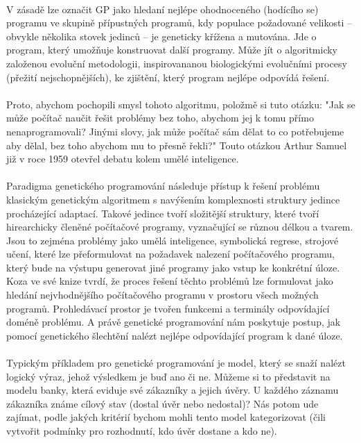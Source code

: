 \documentclass[bc,male,java,dept460]{diploma}		%
\begin{document}
\paragraph*{}
V zásadě lze označit GP jako hledaní nejlépe ohodnoceného (hodícího se) programu ve skupině přípustných programů, kdy populace požadované velikosti – obvykle několika stovek jedinců – je geneticky křížena a mutována.
Jde o program, který umožňuje konstruovat další programy. Může jít o algoritmicky založenou evoluční metodologii, inspirovananou biologickými evolučními procesy (přežití nejschopnějších), ke zjištění, který program nejlépe odpovídá řešení.

\paragraph*{}
Proto, abychom pochopili smysl tohoto algoritmu, položmě si tuto otázku: "Jak se může počítač naučit řešit  problémy bez toho, abychom jej k tomu přímo nenaprogramovali? Jinými slovy, jak může počítač sám dělat to co potřebujeme aby dělal, bez toho abychom mu to přesně řekli?" Touto otázkou Arthur Samuel již v roce 1959 otevřel debatu kolem umělé inteligence.

\paragraph*{}
Paradigma genetického programování následuje přístup k řešení problému klasickým genetickým algoritmem s navýšením komplexnosti struktury jedince procházející adaptací. Takové jedince tvoří složitější struktury, které tvoří hirearchicky členěné počítačové programy, vyznačující se různou délkou a tvarem. Jsou to zejména problémy jako umělá inteligence, symbolická regrese, strojové učení, které lze přeformulovat na požadavek nalezení počítačového programu, který bude na výstupu generovat jiné programy jako vstup ke konkrétní úloze. Koza ve své knize tvrdí, že proces řešení těchto problémů lze formulovat jako hledání nejvhodnějšího počítačového programu v prostoru všech možných programů. Prohledávací prostor je tvořen funkcemi a terminály odpovídající doméně problému. A právě genetické programování nám poskytuje postup, jak pomocí genetického šlechtění nalézt nejlépe odpovídající program k dané úloze.

\paragraph*{}
Typickým příkladem pro genetické programování je model, který se snaží nalézt logický výraz, jehož výsledkem je buď ano či ne. Můžeme si to představit na modelu banky, která eviduje své zákazníky a jejich úvěry. U každého záznamu zákazníka známe cílový stav (dostal úvěr nebo nedostal)? Nás potom ude zajímat, podle jakých kritérií bychom mohli tento model kategorizovat (čili vytvořit podmínky pro rozhodnutí, kdo úvěr dostane a kdo ne).
\end{document}
